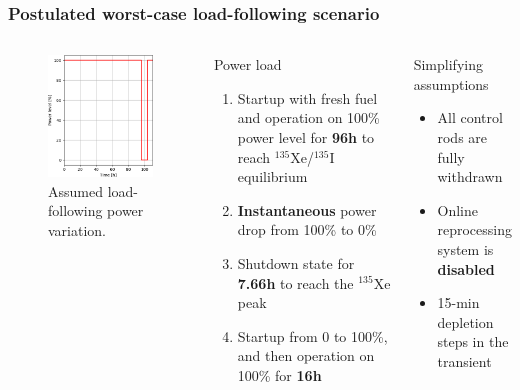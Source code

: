 \begin{frame}
\frametitle{Postulated worst-case load-following scenario}
\vspace{-6mm}
\begin{columns}
	\column[t]{5.5cm}
	\begin{figure}[t]
		\includegraphics[width=\linewidth]{./images/power_load_curve.png}
		\vspace{-6mm}
		\caption{Assumed load-following power variation.}
	\end{figure}
	
	\column[t]{6cm}
	\begin{block}{Power load}
		\begin{enumerate}             
			\item Startup with fresh fuel and operation on 100\% power
			level for \textbf{96h} to reach $^{135}$Xe/$^{135}$I equilibrium
			\item \textbf{Instantaneous} power drop from 100\% to 0\%
			\item Shutdown state for \textbf{7.66h} to reach the 
			$^{135}$Xe peak
			\item Startup from 0 to 100\%, and then operation on 100\% for 
			\textbf{16h}
		\end{enumerate}
	\end{block}
			\vspace{+2mm}
	\begin{block}{Simplifying assumptions}
		\begin{itemize}
			\item All control rods are fully withdrawn
			\item Online reprocessing system is \textbf{disabled}
			\item 15-min depletion steps in the transient
		\end{itemize}


\end{block}
\end{columns}
\end{frame}

